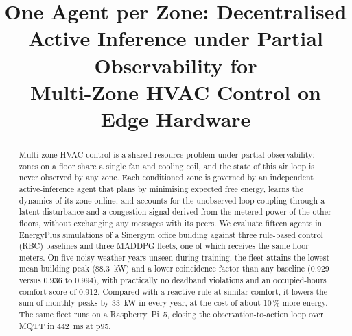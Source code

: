 \documentclass[conference]{IEEEtran}
\begin{document}
\title{One Agent per Zone: Decentralised Active Inference under Partial Observability for\\
Multi-Zone HVAC Control on Edge Hardware}

\author{
\and
{}
\and
{}
\and
{}
\and
{}
}

\maketitle

\begin{abstract}
Multi-zone HVAC control is a shared-resource problem under partial
observability: zones on a floor share a single fan and cooling coil, and the
state of this air loop is never observed by any zone. Each conditioned zone is
governed by an independent active-inference agent that plans by minimising
expected free energy, learns the dynamics of its zone online, and accounts for
the unobserved loop coupling through a latent disturbance and a congestion
signal derived from the metered power of the other floors, without exchanging
any messages with its peers. We evaluate fifteen agents in EnergyPlus
simulations of a Sinergym office building against three rule-based control (RBC) baselines
and three MADDPG fleets, one of which receives the same floor meters. On five
noisy weather years unseen during training, the fleet attains the lowest mean
building peak (\SI{88.3}{\kilo\watt}) and a lower coincidence factor than any
baseline (0.929 versus 0.936 to 0.994), with practically no deadband
violations and an
occupied-hours comfort score of 0.912. Compared with a reactive rule at
similar comfort, it lowers the sum of monthly peaks by \SI{33}{\kilo\watt} in
every year, at the cost of about 10\,\% more energy. The same fleet runs on a
Raspberry~Pi~5, closing the observation-to-action loop over MQTT in
\SI{442}{\milli\second} at p95.
\end{abstract}
\end{document}

